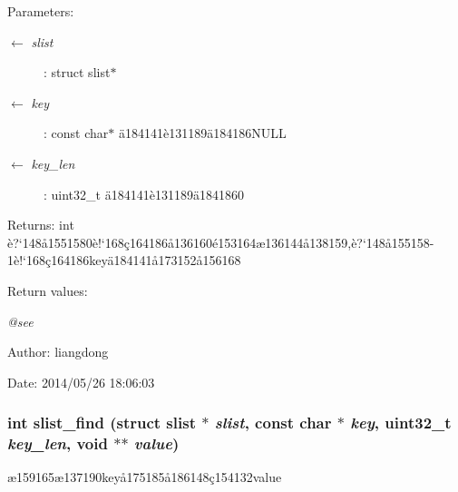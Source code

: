 \begin{Desc}
\item[Parameters:]
\begin{description}
\item[\mbox{$\leftarrow$} {\em slist}]: struct slist$\ast$ \item[\mbox{$\leftarrow$} {\em key}]: const char$\ast$ \"{a}184141\`{e}131189\"{a}184186NULL \item[\mbox{$\leftarrow$} {\em key\_\-len}]: uint32\_\-t \"{a}184141\`{e}131189\"{a}1841860 \end{description}
\end{Desc}
\begin{Desc}
\item[Returns:]int \`{e}?`148\aa{}1551580\`{e}!`168\c{c}164186\aa{}136160\'{e}153164\ae{}136144\aa{}138159,\`{e}?`148\aa{}155158-1\`{e}!`168\c{c}164186key\"{a}184141\aa{}173152\aa{}156168 \end{Desc}
\begin{Desc}
\item[Return values:]
\begin{description}
\item[{\em @see}]\end{description}
\end{Desc}
\begin{Desc}
\item[Author:]liangdong \end{Desc}
\begin{Desc}
\item[Date:]2014/05/26 18:06:03 \end{Desc}
\subsubsection{\setlength{\rightskip}{0pt plus 5cm}int slist\_\-find (struct slist $\ast$ {\em slist}, const char $\ast$ {\em key}, uint32\_\-t {\em key\_\-len}, void $\ast$$\ast$ {\em value})}\label{slist_8h_a4}


\ae{}159165\ae{}137190key\aa{}175185\aa{}186148\c{c}154132value 

